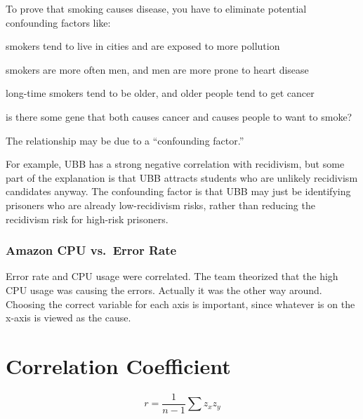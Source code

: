 \documentclass[landscape]{exam}
\begin{document}
  To prove that smoking causes disease, you have to eliminate potential
  confounding factors like:
  \begin{itemize*}
    \item smokers tend to live in cities and are exposed to more pollution
    \item smokers are more often men, and men are more prone to heart disease
    \item long-time smokers tend to be older, and older people tend to get
      cancer
    \item is there some gene that both causes cancer and causes people to
      want to smoke?
  \end{itemize*}

  The relationship may be due to a ``confounding factor.''  
  
  For example, UBB has a strong negative correlation with recidivism, but some
  part of the explanation is that UBB attracts students who are unlikely
  recidivism candidates anyway.   The confounding factor is that UBB may just be
  identifying prisoners who are already low-recidivism risks, rather than
  reducing the recidivism risk for high-risk prisoners.

  \subsubsection{Amazon CPU vs.\ Error Rate} %

  Error rate and CPU usage were correlated. The team theorized that the high
  CPU usage was causing the errors. Actually it was the other way around.
  Choosing the correct variable for each axis is important, since whatever is on
  the x-axis is viewed as the cause.
  

  \section{Correlation Coefficient}
  \[
    r = \frac{1}{n - 1} \sum z_x z_y
  \]
\end{document}

